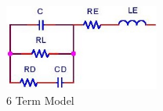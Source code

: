 \begin{figure}[ht!]
\includegraphics[keepaspectratio=true,width=2in]{./figures/modeling/fullModel.jpg}
\centering
\caption{6 Term Model}
\label{fig:fullModel}
\end{figure}
